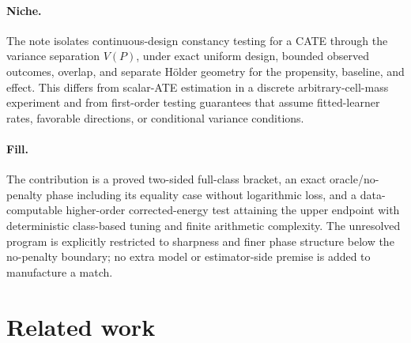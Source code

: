 \documentclass{article}
\begin{document}
\paragraph{Niche.} The note isolates continuous-design constancy testing for a CATE through the variance separation \(V(P)\), under exact uniform design, bounded observed outcomes, overlap, and separate Hölder geometry for the propensity, baseline, and effect. This differs from scalar-ATE estimation in a discrete arbitrary-cell-mass experiment and from first-order testing guarantees that assume fitted-learner rates, favorable directions, or conditional variance conditions.

\paragraph{Fill.} The contribution is a proved two-sided full-class bracket, an exact oracle/no-penalty phase including its equality case without logarithmic loss, and a data-computable higher-order corrected-energy test attaining the upper endpoint with deterministic class-based tuning and finite arithmetic complexity. The unresolved program is explicitly restricted to sharpness and finer phase structure below the no-penalty boundary; no extra model or estimator-side premise is added to manufacture a match.

\section{Related work}
\end{document}
